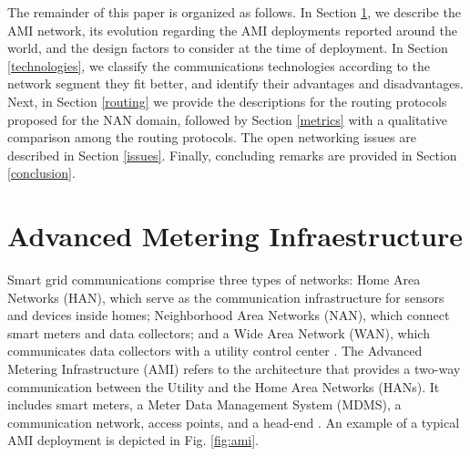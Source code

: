\documentclass[11pt,draftclsnofoot,onecolumn]{IEEEtran}
\begin{document}

The remainder of this paper is organized as follows. In Section \ref{ami}, we describe the AMI network, its evolution regarding the AMI deployments reported around the world, and the design factors to consider at the time of deployment. In Section \ref{technologies}, we classify the communications technologies according to the network segment they fit better, and identify their advantages and disadvantages. Next, in Section \ref{routing} we provide the descriptions for the routing protocols proposed for the NAN domain, followed by Section \ref{metrics} with a qualitative comparison among the routing protocols. The open networking issues are described in Section \ref{issues}. Finally, concluding remarks are provided in Section \ref{conclusion}.

\section{Advanced Metering Infraestructure}\label{ami}

Smart grid communications comprise three types of networks: Home Area Networks (HAN), which serve as the communication infrastructure for sensors and devices inside homes; Neighborhood Area Networks (NAN), which connect smart meters and data collectors; and a Wide Area Network (WAN), which communicates data collectors with a utility control center  \cite{Tang2010}. The Advanced Metering Infrastructure (AMI) refers to the architecture that provides a two-way communication between the Utility and the Home Area Networks (HANs). It includes smart meters, a Meter Data Management System (MDMS), a communication network, access points, and a head-end  \cite{Wang2011b} \cite{Bennett2008}. An example of a typical AMI deployment is depicted in Fig. \ref{fig:ami}.
\end{document}
